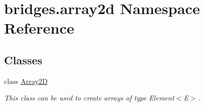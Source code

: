 \hypertarget{namespacebridges_1_1array2d}{}\section{bridges.\+array2d Namespace Reference}
\label{namespacebridges_1_1array2d}
\subsection*{Classes}
\begin{DoxyCompactItemize}
\item 
class \mbox{\hyperlink{classbridges_1_1array2d_1_1_array2_d}{Array2D}}
\begin{DoxyCompactList}\small\item\em This class can be used to create arrays of type Element$<$\+E$>$. \end{DoxyCompactList}\end{DoxyCompactItemize}
